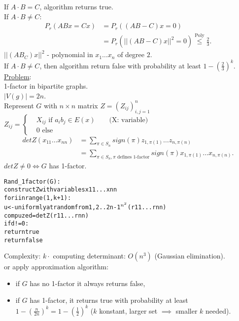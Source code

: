 \documentclass[a4paper, 12pt]{book}
\theoremstyle{definition}
\theoremstyle{remark}
\begin{document}

If $A \cdot B = C$, algorithm returns true. \\
If $A \cdot B \neq C$: \\
\begin{align*}
  P_r(ABx = Cx) &= P_r((AB-C)x = 0) \\
  &= P_r(||(AB-C)x||^2 = 0) \stackrel{\text{Poly}}{\leq} \frac{2}{3}.
\end{align*}
$||(AB_C)x||^2$ - polynomial in $x_1 \dots x_n$ of degree $2$. \\
If $A \cdot B \neq C$, then algorithm return false with probability at least $1 - \left(\frac{2}{3}\right)^k$. \\
\underline{Problem}: \\
1-factor in bipartite graphs. \\
$|V(g)| = 2n$. \\
Represent $G$ with $n \times n$ matrix $Z = (Z_{ij})_{i,j=1}^n$ \\
$Z_{ij} = \begin{cases}
  &X_{ij} \text{ if } a_i b_j \in E(x) \qquad \text{(X: variable)} \\
  &0 \text{ else}
\end{cases}$ \\
\begin{align*}
  det Z(x_{11} \dots x_{nn}) &= \sum_{\pi \in S_n} sign(\pi) z_{1,\pi(1)} \dots z_{n,\pi(n)} \\
  &= \sum_{\pi \in S_n, \pi \text{ defines 1-factor}} sign(\pi) x_{1,\pi(1)} \dots x_{n,\pi(n)}.
\end{align*}
$det Z \neq 0 \iff G$ has 1-factor. \\
\begin{alltt}
  Rand_1factor(G):
    construct Z with variables x11 ... xnn
    for i in range(1,k+1):
      u <- uniformly at random from  {1,2..2n-1}\(\sp{n\sp{2}}\) (r11 ... rnn)
      compuze d = det Z(r11 ... rnn)
      if d != 0:
        return true
    return false
\end{alltt}
Complexity: $k \cdot$ computing determinant: $O\left(n^3\right)$ (Gaussian elimination). \\
or apply approximation algorithm:
\begin{itemize}
  \item if $G$ has no 1-factor it always returns false,
  \item if $G$ has 1-factor, it returns true with probability at least $1-\left(\frac{n}{2n}\right)^k = 1 - \left(\frac{1}{2}\right)^k$
    ($k$ konstant, larger set $\implies$ smaller $k$ needed).
\end{itemize}
\end{document}
